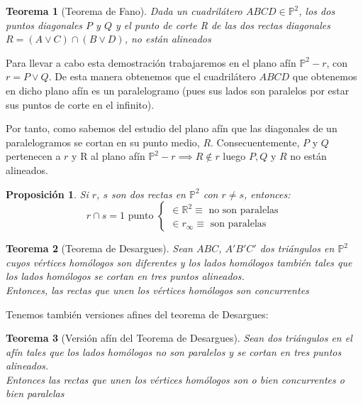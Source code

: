 \documentclass[11pt, a4paper]{article}
\makeatletter
\newif\IfInSansMode
\let\oldsf\sffamily
\renewcommand*{\sffamily}{\oldsf\mathversion{sans}\InSansModetrue}
\let\oldnorm\normalfont
\renewcommand*{\normalfont}{\oldnorm\InSansModefalse\mathversion{normal}}
\renewenvironment{proof}[1][\proofname] {\vspace{-15pt}\par\pushQED{\qed}\normalfont\topsep6\p@\@plus6\p@\relax\trivlist\item[\hskip\labelsep\it#1\@addpunct{.}]\ignorespaces}{\popQED\endtrivlist\@endpefalse}
\newcommand{\R}{\mathbb{R}}
\renewenvironment{proof}[1][\proofname] {\par\pushQED{\qed}\normalfont\topsep6\p@\@plus6\p@\relax\trivlist\item[\hskip\labelsep\itshape\sffamily#1\@addpunct{.}]\ignorespaces}{\popQED\endtrivlist\@endpefalse}
\theoremstyle{theorem-style}
\newtheorem{nth}{Teorema}[section]
\newtheorem{nprop}{Proposición}[section]
\theoremstyle{definition-style}
\theoremstyle{remark-style}
\theoremstyle{example-style}
\makeatother
\begin{document}
\begin{nth}[Teorema de Fano]
	Dada un cuadrilátero $ABCD \in \mathbb{P}^2$, los dos puntos diagonales $P$ y $Q$ y el punto de corte R de las dos rectas diagonales $R = (A \vee C)\cap (B\vee D)$, no están alineados 
\\
	

\end{nth}
\begin{proof}
	Para llevar a cabo esta demostración trabajaremos en el plano afín $\mathbb{P}^2 -r$, con $r = P\vee Q$. De esta manera obtenemos que el cuadrilátero $ABCD$ que obtenemos en dicho plano afín es un paralelogramo (pues sus lados son paralelos por estar sus puntos de corte en el infinito). 
	
	Por tanto, como sabemos del estudio del plano afín que las diagonales de un paralelogramos se cortan en su punto medio, $R$. Consecuentemente, $P$ y $Q$ pertenecen a $r$ y R al plano afín $\mathbb{P}^2 - r \implies R \notin r$ luego $P,Q$ y $R$ no están alineados.  
	\end{proof}

\begin{nprop}
	Si $r$, $s$ son dos rectas en $\mathbb P^2$ con $r\ne s$, entonces:
	\[
	r \cap s = 1 \text { punto } \begin{cases}
	\in \R^2 \equiv \text{ no son paralelas}\\

	\in r_\infty \equiv \text{ son paralelas}
	
\end{cases}
	\]
\end{nprop}

\begin{nth}[Teorema de Desargues]
	Sean $ABC$, $A'B'C'$ dos triángulos en $\mathbb P^2$ cuyos vértices homólogos son diferentes y los lados homólogos también tales que los lados homólogos se cortan en tres puntos alineados.\\
	Entonces, las rectas que unen los vértices homólogos son concurrentes
\end{nth}

Tenemos también versiones afines del teorema de Desargues:

\begin{nth}[Versión afín del Teorema de Desargues]
	Sean dos triángulos en el afín tales que los lados homólogos no son paralelos y se cortan en tres puntos alineados.\\
	  Entonces las rectas que unen los vértices homólogos son o bien concurrentes o bien paralelas
\end{nth}
\end{document}

